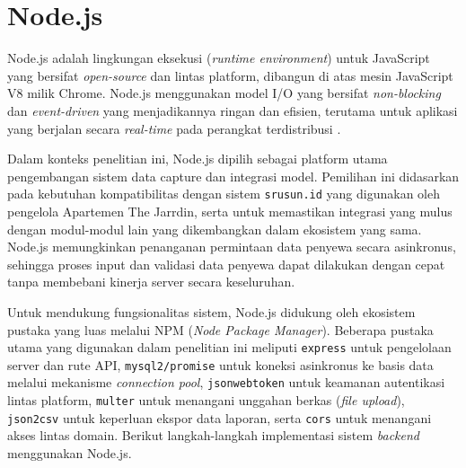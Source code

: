 \section{Node.js}\label{sec:node_js}

Node.js adalah lingkungan eksekusi (\textit{runtime environment}) untuk JavaScript yang bersifat \textit{open-source} dan lintas platform, dibangun di atas mesin JavaScript V8 milik Chrome. Node.js menggunakan model I/O yang bersifat \textit{non-blocking} dan \textit{event-driven} yang menjadikannya ringan dan efisien, terutama untuk aplikasi yang berjalan secara \textit{real-time} pada perangkat terdistribusi \cite{tilkov2010nodejs}.

Dalam konteks penelitian ini, Node.js dipilih sebagai platform utama pengembangan sistem {data capture} dan integrasi model. Pemilihan ini didasarkan pada kebutuhan kompatibilitas dengan sistem \texttt{srusun.id} yang digunakan oleh pengelola Apartemen The Jarrdin, serta untuk memastikan integrasi yang mulus dengan modul-modul lain yang dikembangkan dalam ekosistem yang sama. Node.js memungkinkan penanganan permintaan data penyewa secara asinkronus, sehingga proses input dan validasi data penyewa dapat dilakukan dengan cepat tanpa membebani kinerja server secara keseluruhan.

Untuk mendukung fungsionalitas sistem, Node.js didukung oleh ekosistem pustaka yang luas melalui NPM (\textit{Node Package Manager}). Beberapa pustaka utama yang digunakan dalam penelitian ini meliputi \texttt{express} untuk pengelolaan server dan rute API, \texttt{mysql2/promise} untuk koneksi asinkronus ke basis data melalui mekanisme \textit{connection pool}, \texttt{jsonwebtoken} untuk keamanan autentikasi lintas platform, \texttt{multer} untuk menangani unggahan berkas (\textit{file upload}), \texttt{json2csv} untuk keperluan ekspor data laporan, serta \texttt{cors} untuk menangani akses lintas domain. Berikut langkah-langkah implementasi sistem \textit{backend} menggunakan Node.js.


